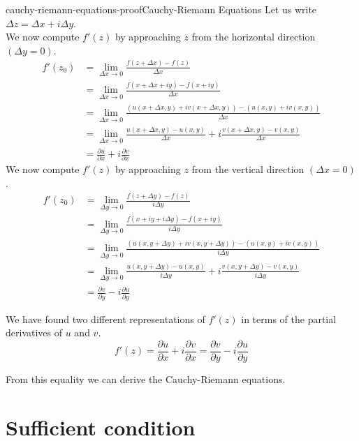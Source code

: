 \documentclass[preview]{standalone}
\begin{document}
\begin{snippetproof}{cauchy-riemann-equations-proof}{Cauchy-Riemann Equations}
    Let us write \(\Delta z = \Delta x + i\Delta y\). \\
    We now compute \(f'(z)\) by approaching \(z\) from the
    horizontal direction \((\Delta y=0)\).
    \begin{align*}
        f'(z_0) &= \lim_{\Delta x \to 0} \frac{f(z + \Delta x) - f(z)}{\Delta x} \\
        &= \lim_{\Delta x \to 0}
        \frac{f(x + \Delta x + iy) - f(x + iy)}{\Delta x} \\
        &= \lim_{\Delta x \to 0}
        \frac{(u(x + \Delta x, y) + iv(x + \Delta x, y)) - (u(x,y)+iv(x,y))}{\Delta x} \\
        &= \lim_{\Delta x \to 0}
        \frac{u(x + \Delta x, y) - u(x,y)}{\Delta x} + i\frac{v(x + \Delta x, y) - v(x,y)}{\Delta x} \\
        &= \frac{\partial u}{\partial x} + i \frac{\partial v}{\partial x}
    \end{align*}
    We now compute \(f'(z)\) by approaching \(z\) from the
    vertical direction \((\Delta x=0)\).
    \begin{align*}
        f'(z_0) &= \lim_{\Delta y \to 0} \frac{f(z + \Delta y) - f(z)}{i\Delta y} \\
        &= \lim_{\Delta y \to 0}
        \frac{f(x + iy + i\Delta y) - f(x + iy)}{i\Delta y} \\
        &= \lim_{\Delta y \to 0}
        \frac{(u(x, y + \Delta y) + iv(x, y + \Delta y)) - (u(x,y)+iv(x,y))}{i\Delta y} \\
        &= \lim_{\Delta y \to 0}
        \frac{u(x, y + \Delta y) - u(x,y)}{i\Delta y} + i\frac{v(x, y + \Delta y) - v(x,y)}{i\Delta y} \\
        &= \frac{\partial v}{\partial y} -i\frac{\partial u}{\partial y}
    \end{align*}
    
    We have found two different representations of \(f'(z)\) in terms
    of the partial derivatives of \(u\) and \(v\).
    \[
        f'(z)=\frac{\partial u}{\partial x} +i\frac{\partial v}{\partial x}
        = \frac{\partial v}{\partial y} -i \frac{\partial u}{\partial y}
    \]
    
    From this equality we can derive the Cauchy-Riemann equations.
\end{snippetproof}

\section{Sufficient condition}
\end{document}
